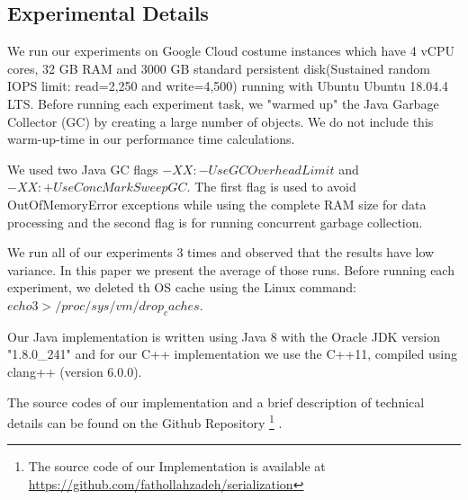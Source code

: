\subsection{Experimental Details}
We run our experiments on Google Cloud costume instances which have 4 vCPU cores, 32 GB RAM and 3000 GB standard persistent disk(Sustained random IOPS limit: read=2,250 and write=4,500) running with Ubuntu Ubuntu 18.04.4 LTS. Before running each experiment task, we "warmed up" the Java Garbage Collector (GC) by creating a large number of objects. We do not include this warm-up-time in our performance time calculations.

We used two Java GC flags $-XX:-UseGCOverheadLimit$ and $-XX:+UseConcMarkSweepGC$. The first flag is used to avoid OutOfMemoryError exceptions while using the complete RAM size for data processing and the second flag is for running concurrent garbage collection.

We run all of our experiments 3 times and observed that the results have low variance. In this paper we present the average of those runs. Before running each experiment, we deleted th OS cache using the Linux command: $echo 3 > /proc/sys/vm/drop_caches$.

Our Java implementation is written using Java 8 with the Oracle JDK version "1.8.0\_241" and for our C++ implementation we use the C++11, compiled using clang++ (version 6.0.0).

The source codes of our implementation and a brief description of technical details can be found on the Github Repository \footnote{The source code of our Implementation is available at \url{https://github.com/fathollahzadeh/serialization}} .
